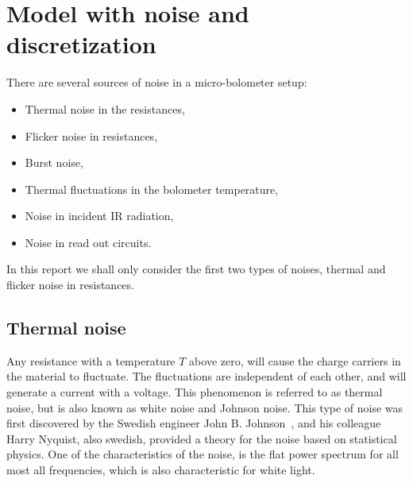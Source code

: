 \section{Model with noise and discretization}

There are several sources of noise in a micro-bolometer setup:
\begin{itemize}
\item Thermal noise in the resistances,
\item Flicker noise in resistances,
\item Burst noise,
\item Thermal fluctuations in the bolometer temperature,
\item Noise in incident IR radiation,
\item Noise in read out circuits.
\end{itemize}

In this report we shall only consider the first two types of noises,
thermal and flicker noise in resistances.

\subsection{Thermal noise}

Any resistance with a temperature $T$ above zero, will cause the
charge carriers in the material to fluctuate. The fluctuations are
independent of each other, and will generate a current with a
voltage. This phenomenon is referred to as thermal noise, but is also
known as white noise and Johnson noise. This type of noise was first
discovered by the Swedish engineer John
B. Johnson~\cite{PhysRev.32.97}, and his colleague Harry Nyquist, also
swedish, provided a theory for the noise based on statistical
physics\cite{PhysRev.32.110}. One of the characteristics of the noise,
is the flat power spectrum for all most all frequencies, which is also
characteristic for white light.

